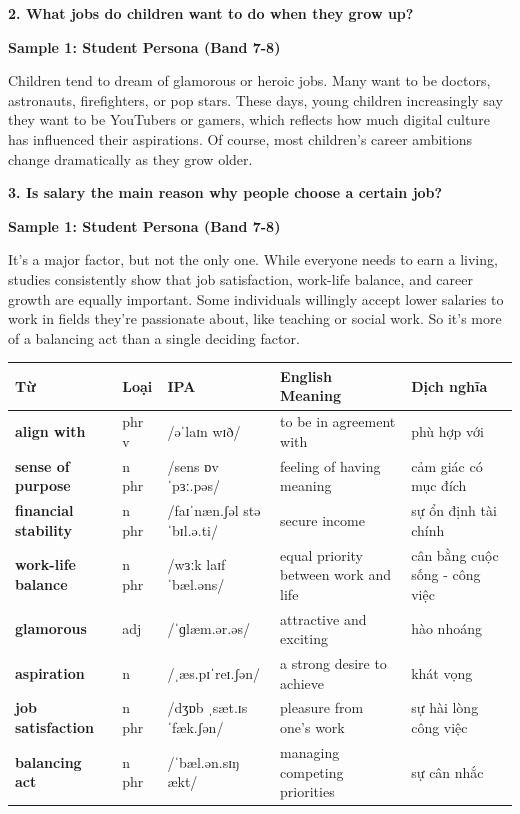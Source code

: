 \separator

\begin{ieltsquestion}
\textbf{2. What jobs do children want to do when they grow up?}
\end{ieltsquestion}
\textbf{Sample 1: Student Persona (Band 7-8)}

Children tend to dream of glamorous or heroic jobs. Many want to be doctors, astronauts, firefighters, or pop stars. These days, young children increasingly say they want to be YouTubers or gamers, which reflects how much digital culture has influenced their aspirations. Of course, most children's career ambitions change dramatically as they grow older.

\separator

\begin{ieltsquestion}
\textbf{3. Is salary the main reason why people choose a certain job?}
\end{ieltsquestion}
\textbf{Sample 1: Student Persona (Band 7-8)}

It's a major factor, but not the only one. While everyone needs to earn a living, studies consistently show that job satisfaction, work-life balance, and career growth are equally important. Some individuals willingly accept lower salaries to work in fields they're passionate about, like teaching or social work. So it's more of a balancing act than a single deciding factor.

\separator


\vspace{0.8em}
\begin{center}
\renewcommand{\arraystretch}{1.65}
\begin{tabularx}{\textwidth}{|V{0.22\textwidth}|C{0.07\textwidth}|I{0.20\textwidth}|Y|V{0.18\textwidth}|}
\hline
{}
\textbf{Từ} & \textbf{Loại} & \textbf{IPA} & \textbf{English Meaning} & \textbf{Dịch nghĩa} \\
\hline
\textbf{align with} & phr v & /əˈlaɪn wɪð/ & to be in agreement with & phù hợp với \\ \hline
\textbf{sense of purpose} & n phr & /sens ɒv ˈpɜː.pəs/ & feeling of having meaning & cảm giác có mục đích \\ \hline
\textbf{financial stability} & n phr & /faɪˈnæn.ʃəl stəˈbɪl.ə.ti/ & secure income & sự ổn định tài chính \\ \hline
\textbf{work-life balance} & n phr & /wɜːk laɪf ˈbæl.əns/ & equal priority between work and life & cân bằng cuộc sống - công việc \\ \hline
\textbf{glamorous} & adj & /ˈɡlæm.ər.əs/ & attractive and exciting & hào nhoáng \\ \hline
\textbf{aspiration} & n & /ˌæs.pɪˈreɪ.ʃən/ & a strong desire to achieve & khát vọng \\ \hline
\textbf{job satisfaction} & n phr & /dʒɒb ˌsæt.ɪsˈfæk.ʃən/ & pleasure from one's work & sự hài lòng công việc \\ \hline
\textbf{balancing act} & n phr & /ˈbæl.ən.sɪŋ ækt/ & managing competing priorities & sự cân nhắc \\ \hline
\end{tabularx}
\end{center}


